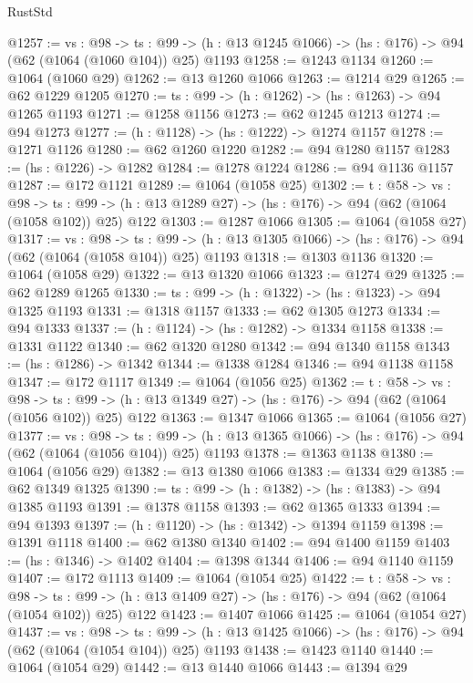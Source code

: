 \begin{lexlean}{RustStd}
\begin{coremodule}
@1257 := {vs : @98} ->
  {ts : @99} -> (h : @13 @1245 @1066) -> (hs : @176) -> @94 (@62 (@1064 (@1060 @104)) @25) @1193
@1258 := @1243 @1134
@1260 := @1064 (@1060 @29)
@1262 := @13 @1260 @1066
@1263 := @1214 @29
@1265 := @62 @1229 @1205
@1270 := {ts : @99} -> (h : @1262) -> (hs : @1263) -> @94 @1265 @1193
@1271 := @1258 @1156
@1273 := @62 @1245 @1213
@1274 := @94 @1273
@1277 := (h : @1128) -> (hs : @1222) -> @1274 @1157
@1278 := @1271 @1126
@1280 := @62 @1260 @1220
@1282 := @94 @1280 @1157
@1283 := (hs : @1226) -> @1282
@1284 := @1278 @1224
@1286 := @94 @1136 @1157
@1287 := @172 @1121
@1289 := @1064 (@1058 @25)
@1302 := {t : @58} ->
  {vs : @98} ->
  {ts : @99} -> (h : @13 @1289 @27) -> (hs : @176) -> @94 (@62 (@1064 (@1058 @102)) @25) @122
@1303 := @1287 @1066
@1305 := @1064 (@1058 @27)
@1317 := {vs : @98} ->
  {ts : @99} -> (h : @13 @1305 @1066) -> (hs : @176) -> @94 (@62 (@1064 (@1058 @104)) @25) @1193
@1318 := @1303 @1136
@1320 := @1064 (@1058 @29)
@1322 := @13 @1320 @1066
@1323 := @1274 @29
@1325 := @62 @1289 @1265
@1330 := {ts : @99} -> (h : @1322) -> (hs : @1323) -> @94 @1325 @1193
@1331 := @1318 @1157
@1333 := @62 @1305 @1273
@1334 := @94 @1333
@1337 := (h : @1124) -> (hs : @1282) -> @1334 @1158
@1338 := @1331 @1122
@1340 := @62 @1320 @1280
@1342 := @94 @1340 @1158
@1343 := (hs : @1286) -> @1342
@1344 := @1338 @1284
@1346 := @94 @1138 @1158
@1347 := @172 @1117
@1349 := @1064 (@1056 @25)
@1362 := {t : @58} ->
  {vs : @98} ->
  {ts : @99} -> (h : @13 @1349 @27) -> (hs : @176) -> @94 (@62 (@1064 (@1056 @102)) @25) @122
@1363 := @1347 @1066
@1365 := @1064 (@1056 @27)
@1377 := {vs : @98} ->
  {ts : @99} -> (h : @13 @1365 @1066) -> (hs : @176) -> @94 (@62 (@1064 (@1056 @104)) @25) @1193
@1378 := @1363 @1138
@1380 := @1064 (@1056 @29)
@1382 := @13 @1380 @1066
@1383 := @1334 @29
@1385 := @62 @1349 @1325
@1390 := {ts : @99} -> (h : @1382) -> (hs : @1383) -> @94 @1385 @1193
@1391 := @1378 @1158
@1393 := @62 @1365 @1333
@1394 := @94 @1393
@1397 := (h : @1120) -> (hs : @1342) -> @1394 @1159
@1398 := @1391 @1118
@1400 := @62 @1380 @1340
@1402 := @94 @1400 @1159
@1403 := (hs : @1346) -> @1402
@1404 := @1398 @1344
@1406 := @94 @1140 @1159
@1407 := @172 @1113
@1409 := @1064 (@1054 @25)
@1422 := {t : @58} ->
  {vs : @98} ->
  {ts : @99} -> (h : @13 @1409 @27) -> (hs : @176) -> @94 (@62 (@1064 (@1054 @102)) @25) @122
@1423 := @1407 @1066
@1425 := @1064 (@1054 @27)
@1437 := {vs : @98} ->
  {ts : @99} -> (h : @13 @1425 @1066) -> (hs : @176) -> @94 (@62 (@1064 (@1054 @104)) @25) @1193
@1438 := @1423 @1140
@1440 := @1064 (@1054 @29)
@1442 := @13 @1440 @1066
@1443 := @1394 @29

\end{coremodule}
\end{lexlean}
